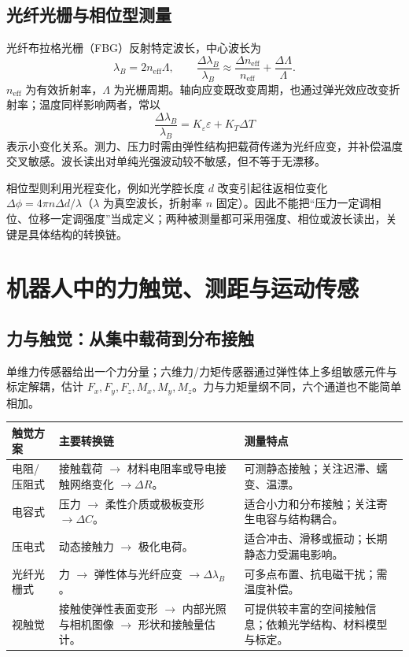 \subsection{光纤光栅与相位型测量}
光纤布拉格光栅（FBG）反射特定波长，中心波长为
\[
\boxed{\lambda_B=2n_{\mathrm{eff}}\Lambda},\qquad
\frac{\Delta\lambda_B}{\lambda_B}
\approx\frac{\Delta n_{\mathrm{eff}}}{n_{\mathrm{eff}}}
+\frac{\Delta\Lambda}{\Lambda}.
\]
$n_{\mathrm{eff}}$ 为有效折射率，$\Lambda$ 为光栅周期。轴向应变既改变周期，也通过弹光效应改变折射率；温度同样影响两者，常以
\[
\frac{\Delta\lambda_B}{\lambda_B}=K_\varepsilon\varepsilon+K_T\Delta T
\]
表示小变化关系。测力、压力时需由弹性结构把载荷传递为光纤应变，并补偿温度交叉敏感。波长读出对单纯光强波动较不敏感，但不等于无漂移。

相位型则利用光程变化，例如光学腔长度 $d$ 改变引起往返相位变化 $\Delta\phi=4\pi n\Delta d/\lambda$（$\lambda$ 为真空波长，折射率 $n$ 固定）。因此不能把“压力一定调相位、位移一定调强度”当成定义；两种被测量都可采用强度、相位或波长读出，关键是具体结构的转换链。

\Needspace{5cm}
\section{机器人中的力触觉、测距与运动传感}
\label{sec:ch4-robot-sensing}
\subsection{力与触觉：从集中载荷到分布接触}
单维力传感器给出一个力分量；六维力/力矩传感器通过弹性体上多组敏感元件与标定解耦，估计 $F_x,F_y,F_z,M_x,M_y,M_z$。力与力矩量纲不同，六个通道也不能简单相加。

\begin{table}[H]
\centering\small
\begin{tabularx}{\linewidth}{@{}p{2.1cm} X X@{}}
\toprule
触觉方案 & 主要转换链 & 测量特点 \\
\midrule
电阻/压阻式 & 接触载荷 $\to$ 材料电阻率或导电接触网络变化 $\to\Delta R$。 & 可测静态接触；关注迟滞、蠕变、温漂。 \\
电容式 & 压力 $\to$ 柔性介质或极板变形 $\to\Delta C$。 & 适合小力和分布接触；关注寄生电容与结构耦合。 \\
压电式 & 动态接触力 $\to$ 极化电荷。 & 适合冲击、滑移或振动；长期静态力受漏电影响。 \\
光纤光栅式 & 力 $\to$ 弹性体与光纤应变 $\to\Delta\lambda_B$。 & 可多点布置、抗电磁干扰；需温度补偿。 \\
视触觉 & 接触使弹性表面变形 $\to$ 内部光照与相机图像 $\to$ 形状和接触量估计。 & 可提供较丰富的空间接触信息；依赖光学结构、材料模型与标定。 \\
\bottomrule
\end{tabularx}
\end{table}

